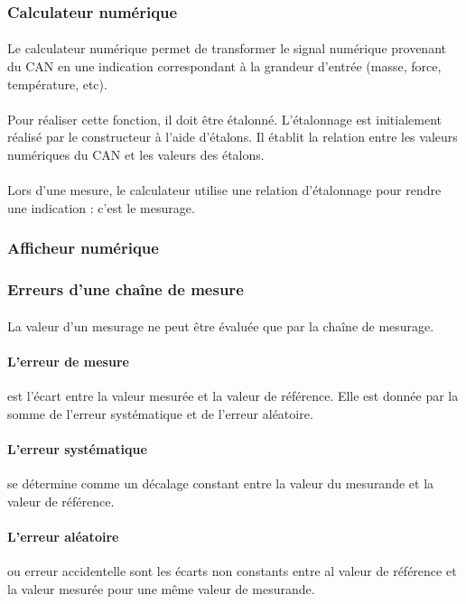 \documentclass{article}
\begin{document}
\subsubsection{Calculateur numérique}
\paragraph{}
Le calculateur numérique permet de transformer le signal numérique provenant du CAN en une indication correspondant à la grandeur d'entrée (masse, force, température, etc).

\paragraph{}
Pour réaliser cette fonction, il doit être étalonné. L'étalonnage est initialement réalisé par le constructeur à l'aide d'étalons. Il établit la relation entre les valeurs numériques du CAN et les valeurs des étalons.

\paragraph{}
Lors d'une mesure, le calculateur utilise une relation d'étalonnage pour rendre une indication : c'est le mesurage.






\subsubsection{Afficheur numérique}


\subsubsection{Erreurs d'une chaîne de mesure}
\paragraph{}
La valeur d'un mesurage ne peut être évaluée que par la chaîne de mesurage. 

\paragraph{L'erreur de mesure} est l'écart entre la valeur mesurée et la valeur de référence. Elle est donnée par la somme de l'erreur systématique et de l'erreur aléatoire.

\paragraph{L'erreur systématique} se détermine comme un décalage constant entre la valeur du mesurande et la valeur de référence.

\paragraph{L'erreur aléatoire} ou erreur accidentelle sont les écarts non constants entre al valeur de référence et la valeur mesurée pour une même valeur de mesurande.
\end{document}
